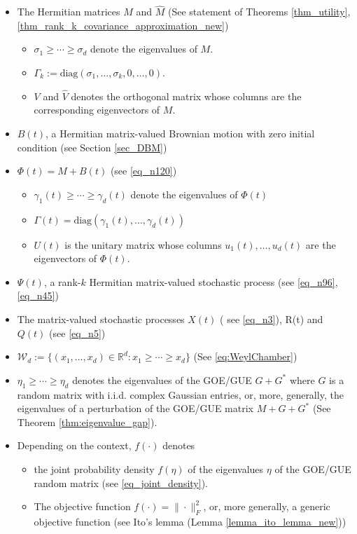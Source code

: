 \documentclass[11pt,letterpaper]{article}
\begin{document}
    \begin{itemize}
 \item  The Hermitian matrices $M$ and $\hat{M}$ (See statement of Theorems \ref{thm_utility}, \ref{thm_rank_k_covariance_approximation_new})

\begin{itemize}   
 \item $\sigma_1 \geq \cdots \geq \sigma_d$ denote the eigenvalues of $M$.
 \item $\Gamma_k := \mathrm{diag}(\sigma_1,\ldots, \sigma_k,0,\ldots,0)$.
 \item $V$ and $\hat{V}$ denotes the orthogonal matrix whose columns are the corresponding eigenvectors of $M$.
   \end{itemize} 

\item   $B(t)$, a Hermitian matrix-valued Brownian motion with zero initial condition  (see Section \ref{sec_DBM})
\item  $\Phi(t)= M + B(t)$  (see \eqref{eq_n120})
\begin{itemize}
\item $\gamma_1(t) \geq \cdots \geq \gamma_d(t)$ denote the eigenvalues of  $\Phi(t)$ 
\item $\Gamma(t) = \mathrm{diag}(\gamma_1(t), \ldots, \gamma_d(t))$
\item  $U(t)$ is the unitary matrix whose columns $u_1(t), \ldots, u_d(t)$ are the eigenvectors of $\Phi(t)$.
\end{itemize}
%
\item $\Psi(t)$, a rank-$k$ Hermitian matrix-valued stochastic process (see \eqref{eq_n96}, \eqref{eq_n45})

\item The matrix-valued stochastic processes $X(t)$ ( see \eqref{eq_n3}), R(t) and $Q(t)$ (see \eqref{eq_n5})
   
     \item   $\mathcal{W}_d := \{(x_1, \ldots, x_d) \in \mathbb{R}^d:  x_1 \geq \cdots \geq x_d\}$ (See \eqref{eq:WeylChamber})
 
   \item $\eta_1\geq \cdots \geq \eta_d$ denotes the eigenvalues of the  GOE/GUE $G+G^\ast$ where $G$ is a random matrix with i.i.d. complex Gaussian entries, or, more, generally, the eigenvalues of a perturbation of the GOE/GUE matrix $M+G + G^\ast$ (See Theorem \ref{thm:eigenvalue_gap}).

\item Depending on the context, $f(\cdot)$ denotes
\begin{itemize}
%
\item the joint probability density $f(\eta)$ of the eigenvalues $\eta$ of the GOE/GUE random matrix (see \eqref{eq_joint_density}).
%
\item The objective function $f(\cdot) = \|\cdot \|_F^2$, or, more generally, a generic objective function (see Ito's lemma (Lemma \ref{lemma_ito_lemma_new}))
\end{itemize}


\end{itemize}
\end{document}
